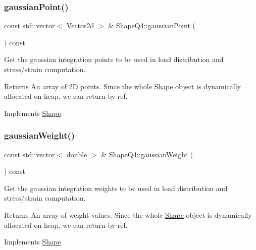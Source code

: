 \subsubsection{\texorpdfstring{gaussian\+Point()}{gaussianPoint()}}
{\footnotesize\ttfamily const std\+::vector$<$ Vector2d $>$ \& Shape\+Q4\+::gaussian\+Point (\begin{DoxyParamCaption}{ }\end{DoxyParamCaption}) const\hspace{0.3cm}{\ttfamily [virtual]}}



Get the gaussian integration points to be used in load distribution and stress/strain computation. 

\begin{DoxyReturn}{Returns}
An array of 2D points. Since the whole \mbox{\hyperlink{class_shape}{Shape}} object is dynamically allocated on heap, we can return-\/by-\/ref. 
\end{DoxyReturn}


Implements \mbox{\hyperlink{class_shape_afa8029d0991fc5d9054a667823224bd0}{Shape}}.

\mbox{\label{class_shape_q4_a51233dd1caaabbe8404c06b5b0db5755}} 
\subsubsection{\texorpdfstring{gaussian\+Weight()}{gaussianWeight()}}
{\footnotesize\ttfamily const std\+::vector$<$ double $>$ \& Shape\+Q4\+::gaussian\+Weight (\begin{DoxyParamCaption}{ }\end{DoxyParamCaption}) const\hspace{0.3cm}{\ttfamily [virtual]}}



Get the gaussian integration weights to be used in load distribution and stress/strain computation. 

\begin{DoxyReturn}{Returns}
An array of weight values. Since the whole \mbox{\hyperlink{class_shape}{Shape}} object is dynamically allocated on heap, we can return-\/by-\/ref. 
\end{DoxyReturn}


Implements \mbox{\hyperlink{class_shape_a4257697bb443af2871a7cc7a82c8c823}{Shape}}.

